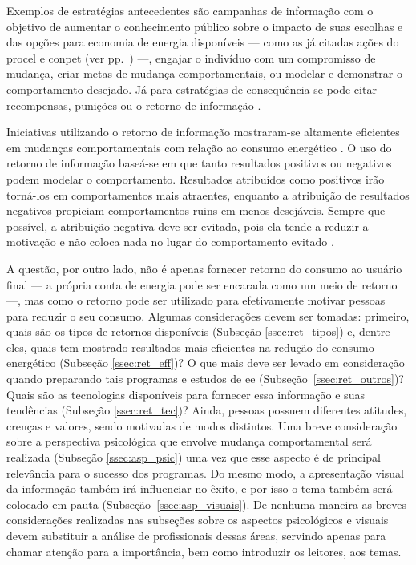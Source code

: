 Exemplos de estratégias antecedentes são campanhas de informação 
com o objetivo de aumentar o conhecimento público sobre o impacto de suas 
escolhas e das opções para economia de energia disponíveis --- como 
as já citadas ações do \gls{procel} e \gls{conpet} (ver pp.~\pageref{text:prog_cepel}) ---,
engajar o indivíduo com um compromisso de mudança, criar metas de mudança
comportamentais, ou modelar e demonstrar o comportamento desejado. Já para
estratégias de consequência se pode citar recompensas, punições ou o
retorno de informação \cite{aceee_2010_estudos_feedback,2009_epri}. 

Iniciativas utilizando o retorno de informação mostraram-se altamente eficientes
em mudanças comportamentais com relação ao consumo energético \cite{
aceee_2010_estudos_feedback,2009_epri,2012_schleich__austria,
2011_zhifeng_smart_energy_savings,2006_darby,2009_nber_studies_us,
ucla_studies_1975_2011_usa,2010_nilm_melhorando_pph_usa_37}. O uso do
retorno de informação baseá-se em que tanto resultados positivos ou
negativos podem modelar o comportamento. Resultados atribuídos como
positivos irão torná-los em comportamentos mais atraentes, enquanto a
atribuição de resultados negativos propiciam comportamentos ruins em
menos desejáveis. Sempre que possível, a atribuição negativa deve ser
evitada, pois ela tende a reduzir a motivação e não coloca nada no
lugar do comportamento evitado \cite{2010_aspectos_psicologicos_usa}.

A questão, por outro lado, não é apenas fornecer retorno do consumo ao usuário
final --- a própria conta de energia pode ser encarada como um meio de retorno
---, mas como o retorno pode ser utilizado para efetivamente motivar pessoas
para reduzir o seu consumo. Algumas considerações devem ser tomadas: primeiro,
quais são os tipos de retornos disponíveis (Subseção \ref{ssec:ret_tipos}) e,
dentre eles, quais tem mostrado resultados mais eficientes na redução do
consumo energético (Subseção \ref{ssec:ret_eff})? O que mais deve ser levado
em consideração quando preparando tais programas e estudos de \gls{ee}
(Subseção~\ref{ssec:ret_outros})? Quais são as tecnologias disponíveis para
fornecer essa informação e suas tendências (Subseção \ref{ssec:ret_tec})?
Ainda, pessoas possuem diferentes atitudes, crenças e valores, sendo motivadas
de modos distintos. Uma breve consideração sobre a perspectiva psicológica que
envolve mudança comportamental será realizada (Subseção \ref{ssec:asp_psic})
uma vez que esse aspecto é de principal relevância para o sucesso dos
programas.  Do mesmo modo, a apresentação visual da informação também irá
influenciar no êxito, e por isso o tema também será colocado em pauta
(Subseção~\ref{ssec:asp_visuais}). De nenhuma maneira as breves considerações
realizadas nas subseções sobre os aspectos psicológicos e visuais devem
substituir a análise de profissionais dessas áreas, servindo apenas para chamar
atenção para a importância, bem como introduzir os leitores, aos temas. 

